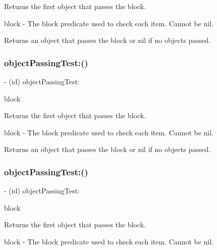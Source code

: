 Returns the first object that passes the block.

block -\/ The block predicate used to check each item. Cannot be nil.

Returns an object that passes the block or nil if no objects passed. \mbox{\label{interface_r_a_c_sequence_a38ac274b6fbd87f0ea24f32d1a2d766b}} 
\subsubsection{\texorpdfstring{object\+Passing\+Test\+:()}{objectPassingTest:()}\hspace{0.1cm}{\footnotesize\ttfamily [2/3]}}
{\footnotesize\ttfamily -\/ (id) object\+Passing\+Test\+: \begin{DoxyParamCaption}\item[{(B\+O\+OL($^\wedge$)(id value))}]{block }\end{DoxyParamCaption}}

Returns the first object that passes the block.

block -\/ The block predicate used to check each item. Cannot be nil.

Returns an object that passes the block or nil if no objects passed. \mbox{\label{interface_r_a_c_sequence_a38ac274b6fbd87f0ea24f32d1a2d766b}} 
\subsubsection{\texorpdfstring{object\+Passing\+Test\+:()}{objectPassingTest:()}\hspace{0.1cm}{\footnotesize\ttfamily [3/3]}}
{\footnotesize\ttfamily -\/ (id) object\+Passing\+Test\+: \begin{DoxyParamCaption}\item[{(B\+O\+OL($^\wedge$)(id value))}]{block }\end{DoxyParamCaption}}

Returns the first object that passes the block.

block -\/ The block predicate used to check each item. Cannot be nil.

